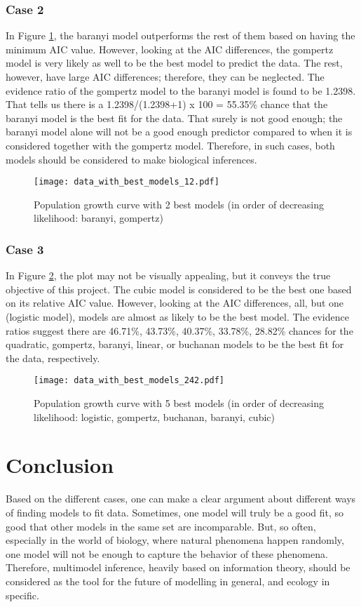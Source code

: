 \documentclass[11pt]{article}
\begin{document}
\begin{linenumbers}
	\subsubsection{Case 2}
	In Figure \ref{tab:figure_12}, the baranyi model outperforms the rest of them based on having the minimum AIC value. However, looking at the AIC differences, the gompertz model is very likely as well to be the best model to predict the data. The rest, however, have large AIC differences; therefore, they can be neglected. The evidence ratio of the gompertz model to the baranyi model is found to be 1.2398. That tells us there is a 1.2398/(1.2398+1) x 100 = 55.35\% chance that the baranyi model is the best fit for the data. That surely is not good enough; the baranyi model alone will not be a good enough predictor compared to when it is considered together with the gompertz model. Therefore, in such cases, both models should be considered to make biological inferences.
	
	\begin{figure}
		\centering
		\texttt{[image: data\_with\_best\_models\_12.pdf]}
		\caption{Population growth curve with 2 best models (in order of decreasing likelihood: baranyi, gompertz)}
		\label{tab:figure_12}
	\end{figure}

	\subsubsection{Case 3}
	In Figure \ref{tab:figure_242}, the plot may not be visually appealing, but it conveys the true objective of this project. The cubic model is considered to be the best one based on its relative AIC value. However, looking at the AIC differences, all, but one (logistic model), models are almost as likely to be the best model. The evidence ratios suggest there are 46.71\%, 43.73\%, 40.37\%, 33.78\%, 28.82\% chances for the quadratic, gompertz, baranyi, linear, or buchanan models to be the best fit for the data, respectively.

	\begin{figure}
		\centering
		\texttt{[image: data\_with\_best\_models\_242.pdf]}
		\caption{Population growth curve with 5 best models (in order of decreasing likelihood: logistic, gompertz, buchanan, baranyi, cubic)}
		\label{tab:figure_242}
	\end{figure}

	\section{Conclusion}
	Based on the different cases, one can make a clear argument about different ways of finding models to fit data. Sometimes, one model will truly be a good fit, so good that other models in the same set are incomparable. But, so often, especially in the world of biology, where natural phenomena happen randomly, one model will not be enough to capture the behavior of these phenomena. Therefore, multimodel inference, heavily based on information theory, should be considered as the tool for the future of modelling in general, and ecology in specific.
	

\end{linenumbers}
\end{document}
